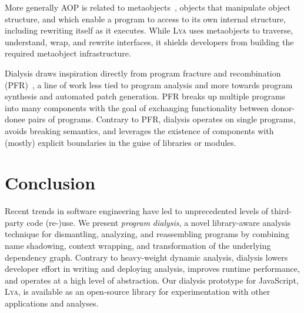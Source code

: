 \documentclass[letterpaper,twocolumn,10pt]{article}
\newcommand{\sys}{{\scshape Lya}\xspace}
\begin{document}
More generally AOP is related to metaobjects~\cite{metaobject}, objects that manipulate object structure, and which enable a program to access to its own internal structure, including rewriting itself as it executes.
While \sys uses metaobjects to traverse, understand, wrap, and rewrite interfaces, it shields developers from building the required metaobject infrastructure.

Dialysis draws inspiration directly from program fracture and recombination (PFR)~\cite{fracture1, fracture3}, a line of work less tied to program analysis and more towards program synthesis and automated patch generation.
PFR breaks up multiple programs into many components with the goal of exchanging functionality between donor-donee pairs of programs.
Contrary to PFR, dialysis operates on single programs, avoids breaking semantics, and leverages the existence of components with (mostly) explicit boundaries in the guise of libraries or modules.

\section{Conclusion}
\label{end}

Recent trends in software engineering have led to unprecedented levels of third-party code (re-)use.
We present \emph{program dialysis}, a novel library-aware analysis technique for dismantling, analyzing, and reassembling programs by combining name shadowing, context wrapping, and transformation of the underlying dependency graph.
Contrary to heavy-weight dynamic analysis, dialysis lowers developer effort in writing and deploying analysis, improves runtime performance, and operates at a high level of abstraction.
Our dialysis prototype for JavaScript, \sys, is available as an open-source library for experimentation with other applications and analyses.




\end{document}
